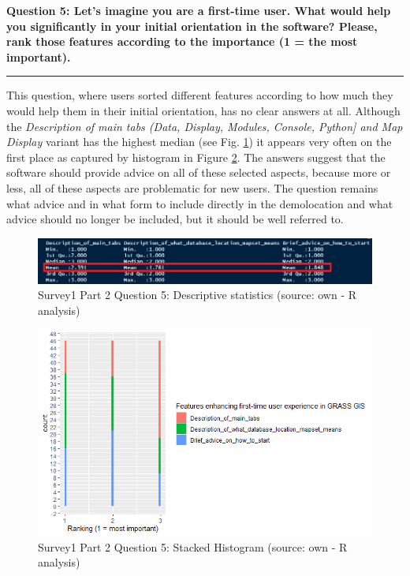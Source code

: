 \documentclass[a4paper,10pt,twoside]{article}
\begin{document}
\newpage
\noindent \textbf{Question 5: Let's imagine you are a first-time user. What would help you significantly in your initial orientation in the software? Please, rank those features according to the importance (1 = the most important).}
\par\noindent\rule{\textwidth}{0.4pt}
\noindent This question, where users sorted different features according to how much they would help them in their initial orientation, has no clear answers at all. Although the \textit{Description of main tabs (Data, Display, Modules, Console, Python] and Map Display} variant has the highest median (see Fig. \ref{fig:survey1_part2_question5_stats}) it appears very often on the first place as captured by histogram in Figure \ref{fig:survey1_part2_question5_histogram_r}. The answers suggest that the software should provide advice on all of these selected aspects, because more or less, all of these aspects are problematic for new users. The question remains what advice and in what form to include directly in the demolocation and what advice should no longer be included, but it should be well referred to.
    
\vspace{0.3cm}
\begin{figure}[hbt!] 
\begin{center}
\includegraphics[width=17cm]{../surveys/analyzed_data/survey1_part2_question5_stats.png} 
\caption[Survey1 Part 2 Question 5: Descriptive statistics]{Survey1 Part 2 Question 5: Descriptive statistics (source: own - R analysis)}
\label{fig:survey1_part2_question5_stats}
\end{center}
\end{figure}

\vspace{0.3cm}
\begin{figure}[hbt!] 
\begin{center}
\includegraphics[width=15cm]{../surveys/analyzed_data/survey1_part2_question5_histogram_r.png} 
\caption[Survey1 Part 2 Question 5: Stacked Histogram]{Survey1 Part 2 Question 5: Stacked Histogram (source: own - R analysis)}
\label{fig:survey1_part2_question5_histogram_r}
\end{center}
\end{figure}
\end{document}

